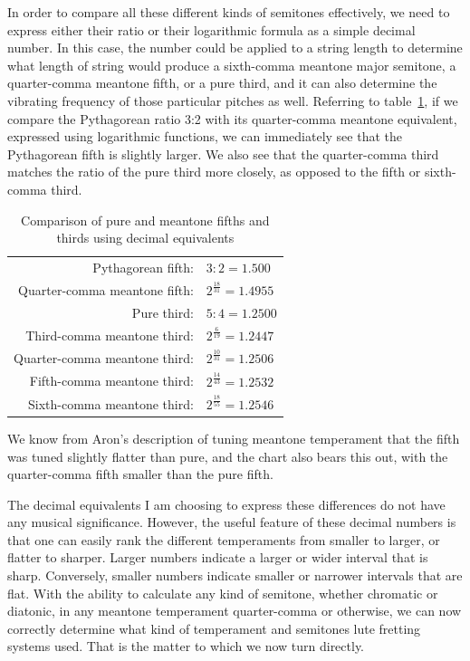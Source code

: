 In order to compare all these different kinds of semitones effectively, we need to
express either their ratio or their logarithmic formula as a simple decimal number. In
this case, the number could be applied to a string length to determine what length of
string would produce a sixth-comma meantone major semitone, a quarter-comma meantone
fifth, or a pure third, and it can also determine the vibrating frequency of those
particular pitches as well. Referring to table~\ref{fifth-comparison}, if we compare
the Pythagorean ratio 3:2 with its quarter-comma meantone equivalent, expressed using
logarithmic functions, we can immediately see that the Pythagorean fifth is slightly
larger. We also see that the quarter-comma third matches the ratio of the
pure third more closely, as opposed to the fifth or sixth-comma third.
\begin{table}[h!]
  \begin{center}
  \begin{tabular}{ r l }
    Pythagorean fifth:      & $ 3:2 = 1.500 $ \\
    Quarter-comma meantone fifth: & $ 2^\frac{18}{31} = 1.4955 $ \\
    \hline
    Pure third:          & $ 5:4 = 1.2500 $ \\
    Third-comma meantone third:  & $ 2^\frac{6}{19} = 1.2447 $ \\
    Quarter-comma meantone third: & $ 2^\frac{10}{31} = 1.2506 $ \\
    Fifth-comma meantone third:  & $ 2^\frac{14}{43} = 1.2532 $ \\
    Sixth-comma meantone third:  & $ 2^\frac{18}{55} = 1.2546 $ \\
  \end{tabular}
  \end{center}
  \caption{Comparison of pure and meantone fifths and thirds using decimal equivalents}
  \label{fifth-comparison}
\end{table}
We know from Aron's description of tuning meantone temperament that the fifth was
tuned slightly flatter than pure, and the chart also bears this out, with the
quarter-comma fifth smaller than the pure fifth.

The decimal equivalents I am choosing to express these differences do not have any musical significance. However, the
useful feature of these decimal numbers is that one can easily rank the different temperaments from smaller to larger,
or flatter to sharper. Larger numbers indicate a larger or wider interval that is sharp. Conversely, smaller numbers
indicate smaller or narrower intervals that are flat. With the ability to calculate any kind of semitone, whether
chromatic or diatonic, in any meantone temperament quarter-comma or otherwise, we can now correctly determine what kind
of temperament and semitones lute fretting systems used. That is the matter to which we now turn directly.

